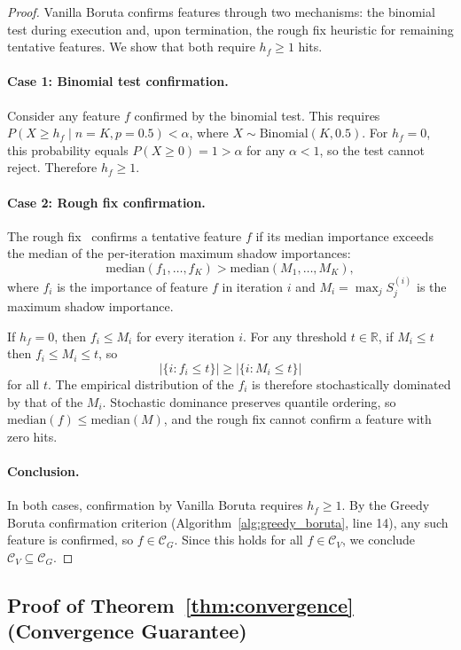 \documentclass[runningheads]{llncs}
\begin{document}
\begin{proof}
Vanilla Boruta confirms features through two mechanisms: the binomial test during execution and, upon termination, the rough fix heuristic for remaining tentative features. We show that both require $h_f \geq 1$ hits.

\paragraph{Case 1: Binomial test confirmation.}
Consider any feature $f$ confirmed by the binomial test. This requires $P(X \geq h_f \mid n = K, p = 0.5) < \alpha$, where $X \sim \text{Binomial}(K, 0.5)$. For $h_f = 0$, this probability equals $P(X \geq 0) = 1 > \alpha$ for any $\alpha < 1$, so the test cannot reject. Therefore $h_f \geq 1$.

\paragraph{Case 2: Rough fix confirmation.}
The rough fix~\cite{kursa2010feature} confirms a tentative feature $f$ if its median importance exceeds the median of the per-iteration maximum shadow importances:
$$\mathrm{median}(f_1, \ldots, f_K) > \mathrm{median}(M_1, \ldots, M_K),$$
where $f_i$ is the importance of feature $f$ in iteration $i$ and $M_i = \max_j S_j^{(i)}$ is the maximum shadow importance.

If $h_f = 0$, then $f_i \leq M_i$ for every iteration $i$. For any threshold $t \in \mathbb{R}$, if $M_i \leq t$ then $f_i \leq M_i \leq t$, so
$$|\{i : f_i \leq t\}| \geq |\{i : M_i \leq t\}|$$
for all $t$. The empirical distribution of the $f_i$ is therefore stochastically dominated by that of the $M_i$. Stochastic dominance preserves quantile ordering, so $\mathrm{median}(f) \leq \mathrm{median}(M)$, and the rough fix cannot confirm a feature with zero hits.

\paragraph{Conclusion.}
In both cases, confirmation by Vanilla Boruta requires $h_f \geq 1$. By the Greedy Boruta confirmation criterion (Algorithm~\ref{alg:greedy_boruta}, line 14), any such feature is confirmed, so $f \in \mathcal{C}_G$. Since this holds for all $f \in \mathcal{C}_V$, we conclude $\mathcal{C}_V \subseteq \mathcal{C}_G$.
\end{proof}

\subsection{Proof of Theorem~\ref{thm:convergence} (Convergence Guarantee)}
\end{document}
